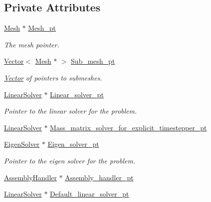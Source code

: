 \subsection*{Private Attributes}
\begin{DoxyCompactItemize}
\item 
\hyperlink{classoomph_1_1Mesh}{Mesh} $\ast$ \hyperlink{classoomph_1_1Problem_aa4a3bf9419e495aaaaea0dcb00ea53e5}{Mesh\+\_\+pt}
\begin{DoxyCompactList}\small\item\em The mesh pointer. \end{DoxyCompactList}\item 
\hyperlink{classoomph_1_1Vector}{Vector}$<$ \hyperlink{classoomph_1_1Mesh}{Mesh} $\ast$ $>$ \hyperlink{classoomph_1_1Problem_ab65f6fc9c49860e6324457a7e6e76346}{Sub\+\_\+mesh\+\_\+pt}
\begin{DoxyCompactList}\small\item\em \hyperlink{classoomph_1_1Vector}{Vector} of pointers to submeshes. \end{DoxyCompactList}\item 
\hyperlink{classoomph_1_1LinearSolver}{Linear\+Solver} $\ast$ \hyperlink{classoomph_1_1Problem_a519de6f6f70c8b0f6bacbde5e0a35cd7}{Linear\+\_\+solver\+\_\+pt}
\begin{DoxyCompactList}\small\item\em Pointer to the linear solver for the problem. \end{DoxyCompactList}\item 
\hyperlink{classoomph_1_1LinearSolver}{Linear\+Solver} $\ast$ \hyperlink{classoomph_1_1Problem_ad4b9d15269f624044d1730957b0a8c19}{Mass\+\_\+matrix\+\_\+solver\+\_\+for\+\_\+explicit\+\_\+timestepper\+\_\+pt}
\item 
\hyperlink{classoomph_1_1EigenSolver}{Eigen\+Solver} $\ast$ \hyperlink{classoomph_1_1Problem_ab7938313fa45df9be16515a6b0bfd324}{Eigen\+\_\+solver\+\_\+pt}
\begin{DoxyCompactList}\small\item\em Pointer to the eigen solver for the problem. \end{DoxyCompactList}\item 
\hyperlink{classoomph_1_1AssemblyHandler}{Assembly\+Handler} $\ast$ \hyperlink{classoomph_1_1Problem_aefc325e2e116c389a24c9871e41bdb55}{Assembly\+\_\+handler\+\_\+pt}
\item 
\hyperlink{classoomph_1_1LinearSolver}{Linear\+Solver} $\ast$ \hyperlink{classoomph_1_1Problem_ad01b385b2b4cd2e0b867754bea7b798a}{Default\+\_\+linear\+\_\+solver\+\_\+pt}

\end{DoxyCompactItemize}
